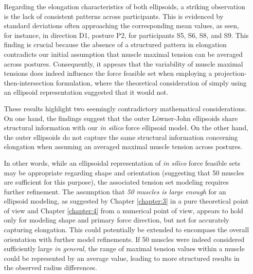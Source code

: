 Regarding the elongation characteristics of both ellipsoids, a striking observation is the lack of consistent patterns across participants. This is evidenced by standard deviations often approaching the corresponding mean values, as seen, for instance, in direction D1, posture P2, for participants S5, S6, S8, and S9. This finding is crucial because the absence of a structured pattern in elongation contradicts our initial assumption that muscle maximal tension can be averaged across postures. Consequently, it appears that the variability of muscle maximal tensions does indeed influence the force feasible set when employing a projection-then-intersection formulation, where the theoretical consideration of simply using an ellipsoid representation suggested that it would not.

These results highlight two seemingly contradictory mathematical considerations. On one hand, the findings suggest that the outer Löwner-John ellipsoids share structural information with our \emph{in silico} force ellipsoid model. On the other hand, the outer ellipsoids do not capture the same structural information concerning elongation when assuming an averaged maximal muscle tension across postures.

In other words, while an ellipsoidal representation of \emph{in silico} force feasible sets may be appropriate regarding shape and orientation (suggesting that 50 muscles are sufficient for this purpose), the associated tension set modeling requires further refinement. The assumption that \emph{50 muscles is large enough} for an ellipsoid modeling, as suggested by Chapter \ref{chapter:3} in a pure theoretical point of view and Chapter \ref{chapter:4} from a numerical point of view, appears to hold only for modeling shape and primary force direction, but not for accurately capturing elongation. This could potentially be extended to encompass the overall orientation with further model refinements. If 50 muscles were indeed considered sufficiently large \emph{in general}, the range of maximal tension values within a muscle could be represented by an average value, leading to more structured results in the observed radius differences.

